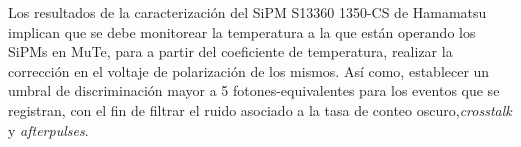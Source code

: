 Los resultados de la caracterización del SiPM  S13360 1350-CS de Hamamatsu implican que se debe monitorear la temperatura a la que están operando los SiPMs en MuTe, para a partir del coeficiente de temperatura, realizar la corrección en el voltaje de polarización de los mismos. Así como, establecer un umbral de discriminación mayor a 5 fotones-equivalentes para los eventos que se registran, con el fin de filtrar el ruido asociado a la tasa de conteo oscuro,\textit{crosstalk} y \textit{afterpulses}.\\ \\

